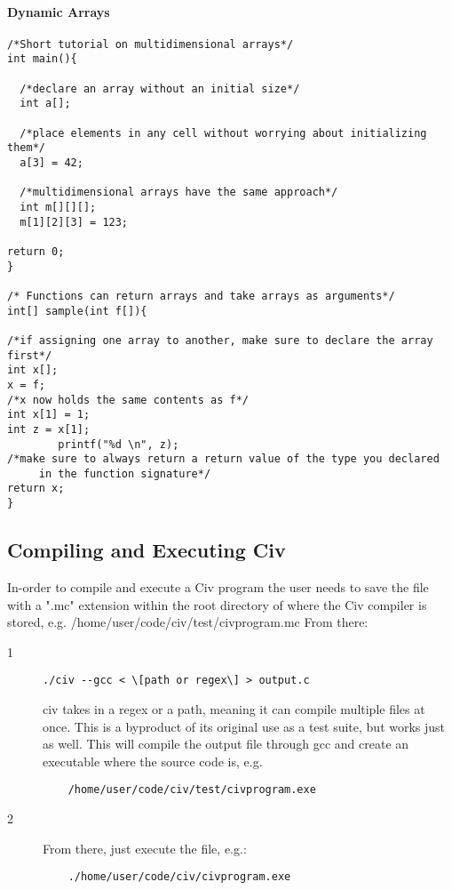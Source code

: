 \documentclass[a4paper]{article}
\begin{document}
\paragraph{Dynamic Arrays}
\begin{verbatim}
/*Short tutorial on multidimensional arrays*/
int main(){

  /*declare an array without an initial size*/
  int a[];

  /*place elements in any cell without worrying about initializing them*/
  a[3] = 42;

  /*multidimensional arrays have the same approach*/
  int m[][][];
  m[1][2][3] = 123;

return 0;
}

/* Functions can return arrays and take arrays as arguments*/
int[] sample(int f[]){

/*if assigning one array to another, make sure to declare the array first*/
int x[];
x = f; 
/*x now holds the same contents as f*/
int x[1] = 1;
int z = x[1];
        printf("%d \n", z); 
/*make sure to always return a return value of the type you declared
     in the function signature*/
return x;
} 
\end{verbatim}

\subsection{Compiling and Executing Civ}
In-order to compile and execute a Civ program the user needs to save the file with a ".mc" extension within the root directory of where the Civ compiler is stored, e.g. 
/home/user/code/civ/test/civprogram.mc
From there:
\begin{description}
    \item[1] \begin{verbatim}./civ --gcc < \[path or regex\] > output.c \end{verbatim}
    \item[] civ takes in a regex or a path, meaning it can compile multiple files at once. This is a byproduct of its original use as a test suite, but works just as well. This will compile the output file through gcc and create an executable where the source code is, e.g.
\begin{verbatim}
    /home/user/code/civ/test/civprogram.exe
\end{verbatim}
    \item[2] From there, just execute the file, e.g.:
\begin{verbatim}
    ./home/user/code/civ/civprogram.exe
\end{verbatim}
\end{description}
\end{document}
